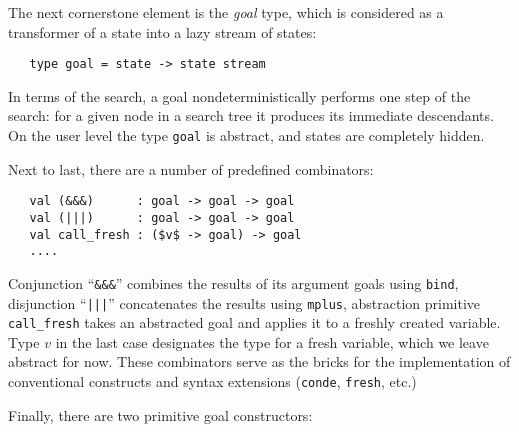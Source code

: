 \begin{comment}
This check is not needed in faster-miniKanren or any other untyped approach to implement
relational DSL. In case of OCanren it is dangerous to allow reification of a logic variable
(attributed by a type one the first state) in the context of an another state where it is attributed by another type.
Cases like this one can trigger undefined behavior. In the current implementation of logical variables created in the foreign
state are not treated as logic variables. This restriction is difficult to express in types, so the check was moved
from compile-time to runtime. This design decision is unfortunate, however this check doesn't affect perfomance in
any significant way and we don't know any useful program where such a mistake can happen.
\end{comment}

The next cornerstone element is the \emph{goal} type, which is considered as a transformer of a state into
a lazy stream of states:

\begin{lstlisting}
   type goal = state -> state stream
\end{lstlisting}

In terms of the search, a goal nondeterministically performs one step of the search: for a given
node in a search tree it produces its immediate descendants. On the user level the type \lstinline{goal}
is abstract, and states are completely hidden.

Next to last, there are a number of predefined combinators:

\begin{lstlisting}
   val (&&&)      : goal -> goal -> goal
   val (|||)      : goal -> goal -> goal
   val call_fresh : ($v$ -> goal) -> goal
   ....
\end{lstlisting}

Conjunction ``\lstinline{&&&}'' combines the results of its argument goals using \lstinline{bind},
disjunction ``\lstinline{|||}'' concatenates the results using \lstinline{mplus}, abstraction
primitive \lstinline{call_fresh} takes an abstracted goal and applies it to a freshly created
variable. Type $v$ in the last case designates the type for a fresh variable, which we leave
abstract for now. These combinators serve as the bricks for the implementation of conventional
\miniKanren constructs and syntax extensions (\lstinline{conde}, \lstinline{fresh}, etc.)

Finally, there are two primitive goal constructors:

